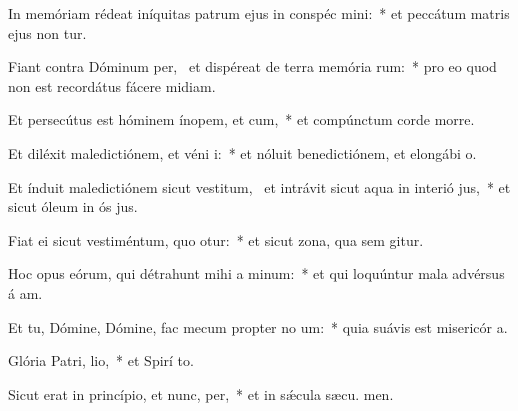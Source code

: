 \item In memóriam rédeat iníquitas patrum ejus in conspéc mini:~* et peccátum matris ejus non tur.
\item Fiant contra Dóminum per,~\pscross{} et dispéreat de terra memória rum:~* pro eo quod non est recordátus fácere midiam.
\item Et persecútus est hóminem ínopem, et cum,~* et compúnctum corde morre.
\item Et diléxit maledictiónem, et véni i:~* et nóluit benedictiónem, et elongábi  o.
\item Et índuit maledictiónem sicut vestitum,~\pscross{} et intrávit sicut aqua in interió jus,~* et sicut óleum in ós jus.
\item Fiat ei sicut vestiméntum, quo otur:~* et sicut zona, qua sem gitur.
\item Hoc opus eórum, qui détrahunt mihi a minum:~* et qui loquúntur mala advérsus á am.
\item Et tu, Dómine, Dómine, fac mecum propter no um:~* quia suávis est misericór a.
\item Glória Patri,  lio,~* et Spirí to.
\item Sicut erat in princípio, et nunc,  per,~* et in sǽcula sæcu. men.
